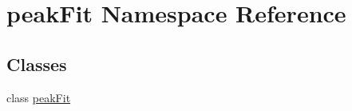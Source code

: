 \hypertarget{namespacepeak_fit}{\section{peak\-Fit Namespace Reference}
\label{namespacepeak_fit}
}
\subsection*{Classes}
\begin{DoxyCompactItemize}
\item 
class \hyperlink{classpeak_fit_1_1peak_fit}{peak\-Fit}
\end{DoxyCompactItemize}
